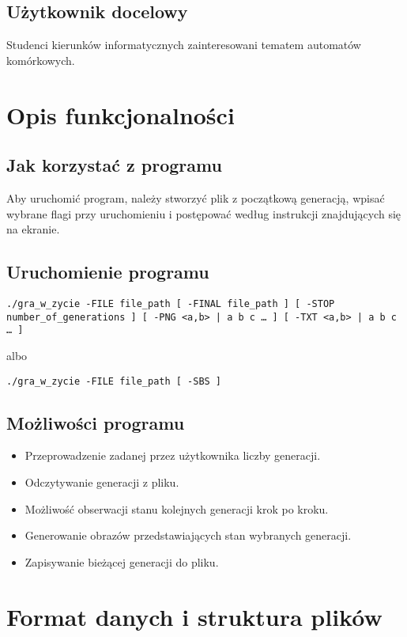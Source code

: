 \documentclass[12pt,a4paper,notitlepage]{report}
\begin{document}
\subsection{Użytkownik docelowy}

Studenci kierunków informatycznych zainteresowani tematem automatów komórkowych.
\section{Opis funkcjonalności}
\subsection{Jak korzystać z programu}
Aby uruchomić program, należy stworzyć plik z początkową generacją, wpisać wybrane flagi przy uruchomieniu i postępować według instrukcji znajdujących się na ekranie.
\subsection{Uruchomienie programu}
\begin{verbatim}
./gra_w_zycie -FILE file_path [ -FINAL file_path ] [ -STOP number_of_generations ] [ -PNG <a,b> | a b c … ] [ -TXT <a,b> | a b c … ] 
\end{verbatim}
albo
\begin{verbatim}
./gra_w_zycie -FILE file_path [ -SBS ]
\end{verbatim}
\subsection{Możliwości programu}
\begin{itemize}
\item Przeprowadzenie zadanej przez użytkownika liczby generacji.
\item Odczytywanie generacji z pliku.
\item Możliwość obserwacji stanu kolejnych generacji krok po kroku.
\item Generowanie obrazów przedstawiających stan wybranych generacji.
\item Zapisywanie bieżącej generacji do pliku.
\end{itemize}
\section{Format danych i struktura plików}
\end{document}
